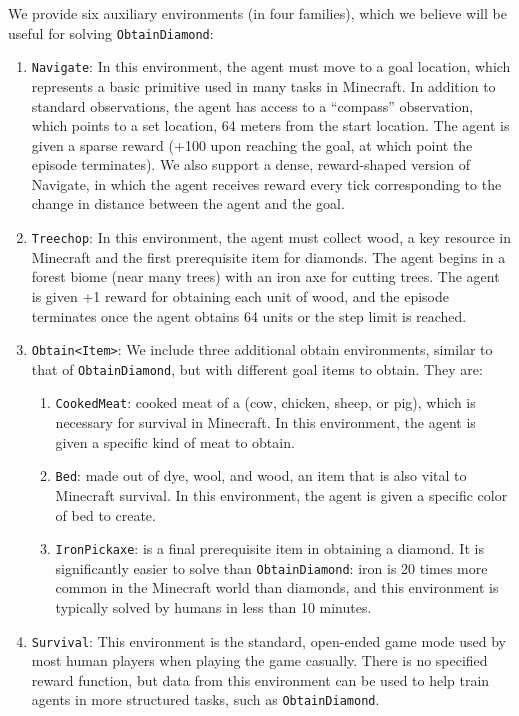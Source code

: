 We provide six auxiliary environments (in four families), which we believe will be useful for solving \texttt{ObtainDiamond}:
\begin{enumerate}
    \item \texttt{Navigate}: In this environment, the agent must move to a goal location, which represents a basic primitive used in many tasks in Minecraft. 
    In addition to standard observations, the agent has access to a ``compass'' observation,
    which points to a set location, 64 meters from the start location. 
    The agent is given a sparse reward (+100 upon reaching the goal, at which point the episode terminates). 
    We also support a dense, reward-shaped version of Navigate, in which the agent receives reward every tick corresponding to the change in distance between the agent and the goal.

    \item \texttt{Treechop}: In this environment, the agent must collect wood, a key resource in Minecraft and the first prerequisite item for diamonds.
    The agent begins in a forest biome (near many trees) with an iron axe for cutting trees. The agent is given +1 reward for obtaining each unit of wood, and the episode terminates once the agent obtains 64 units or the step limit is reached.
    
    \item \texttt{Obtain<Item>}:
    We include three additional obtain environments, similar to that of \texttt{ObtainDiamond},
    but with different goal items to obtain. They are:
    
\begin{enumerate}
    \item \texttt{CookedMeat}: cooked meat of a (cow, chicken, sheep, or pig), which is necessary for survival in Minecraft. In this environment, the agent is given a specific kind of meat to obtain.
    \item \texttt{Bed}: made out of dye, wool, and wood, an item that is also vital to Minecraft survival. In this environment, the agent is given a specific color of bed to create.
    \item \texttt{IronPickaxe}: is a final prerequisite item in obtaining a diamond.
    It is significantly easier to solve than \texttt{ObtainDiamond}: iron is
    20 times more common in the Minecraft world than diamonds, and this environment is typically solved by
    humans in less than 10 minutes.
\end{enumerate}

    \item \texttt{Survival}: This environment is the standard, open-ended game mode used by most human players when playing the game casually.
    There is no specified reward function, but data from this environment can be used
    to help train agents in more structured tasks, such as \texttt{ObtainDiamond}.

\end{enumerate}



